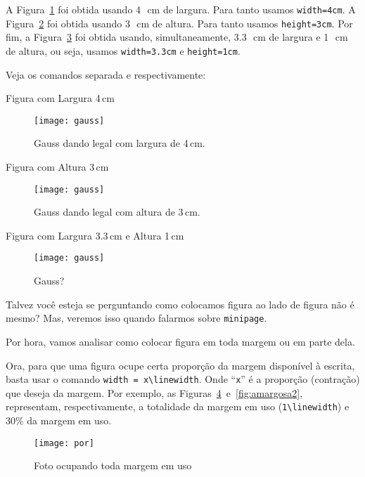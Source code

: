 A Figura~\ref{fig:LeGauss1} foi obtida usando 4~\,cm de largura.
Para tanto usamos \Verb|width=4cm|.
A Figura~\ref{fig:LeGauss2} foi obtida usando 3~\,cm de altura.
Para tanto usamos \Verb|height=3cm|.
Por fim, a Figura~\ref{fig:LeGauss3} foi obtida usando, simultaneamente, 3.3~\,cm 
de largura e 1~\,cm de altura, ou seja, usamos \Verb|width=3.3cm| e \Verb|height=1cm|.

Veja os comandos separada e respectivamente:

\begin{codigo}{Figura com Largura 4\,cm}{\lapis}
\begin{figure}[!htbp]%
\texttt{[image: gauss]}%
\caption{Gauss dando legal com largura de 4\,cm.}%
\label{fig:LeGauss1}%
\end{figure}
\end{codigo}

\begin{codigo}{Figura com Altura 3\,cm}{\lapis}
\begin{figure}[!htbp]
  \texttt{[image: gauss]}
  \caption{Gauss dando legal com altura de 3\,cm.}
  \label{fig:LeGauss2}
\end{figure}
\end{codigo}

\begin{codigo}{Figura com Largura 3.3\,cm e Altura 1\,cm}{\lapis}
\begin{figure}[!htbp]
  \texttt{[image: gauss]}
  \caption{Gauss?}
  \label{fig:LeGauss3}
\end{figure}
\end{codigo}

Talvez você esteja se perguntando como colocamos figura ao lado de figura não é 
mesmo?
Mas, veremos isso quando falarmos sobre \texttt{minipage}.

Por hora, vamos analisar como colocar figura em toda margem ou em parte dela.

Ora, para que uma figura ocupe certa proporção da margem disponível à escrita, 
basta usar o comando \verb|width = x\linewidth|.
Onde ``\Verb|x|'' é a proporção (contração) que deseja da margem.\mn{
  Note que $x\in\left(0, 1\right]$.
}
Por exemplo, as Figuras~\ref{fig:amargosa1}~e~\ref{fig:amargosa2}, representam, 
respectivamente, a totalidade da margem em uso (\verb|1\linewidth|) e $30\%$ da 
margem em uso.

\begin{figure}[!htbp] 
\centering 
\texttt{[image: por]} 
\caption{Foto ocupando toda margem em uso}
\label{fig:amargosa1}
\end{figure}

